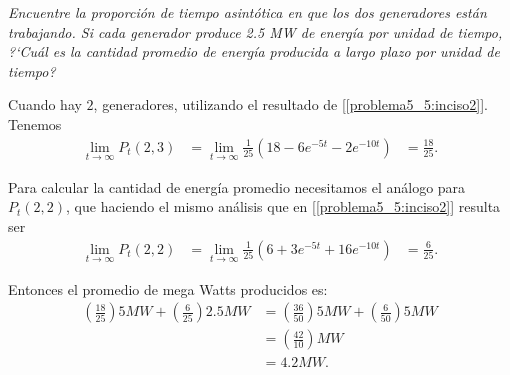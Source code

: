 \emph{
    Encuentre la proporci\'on de tiempo asint\'otica en que los dos generadores est\'an trabajando. 
    Si cada generador produce 2.5 MW de energ\'ia por unidad de tiempo, ?`Cu\'al es la cantidad promedio 
    de energ\'ia producida a largo plazo por unidad de tiempo?\pn
}

\afterstatement\pn

Cuando hay $2$, generadores, utilizando el resultado de [\ref{problema5_5:inciso2}].
Tenemos
\begin{align}
        \lim_{t \rightarrow \infty} P_t(2,3)    &= \lim_{t \rightarrow \infty}   \frac{1}{25}    (18 - 6 e^{-5t} - 2 e^{-10t}) 
                                                &= \frac{18}{25}.
\end{align}\pn

Para calcular la cantidad de energía promedio necesitamos el análogo para $P_t(2, 2)$, que haciendo el mismo
análisis que en [\ref{problema5_5:inciso2}] resulta ser
\begin{align}
        \lim_{t \rightarrow \infty} P_t(2,2)    &=  \lim_{t \rightarrow \infty}   \frac{1}{25}    (6 + 3 e^{-5t} + 16 e^{-10t}) 
                                                &=  \frac{6}{25}.
\end{align}\pn

Entonces el promedio de mega Watts producidos es:
\begin{align}
    \left(\frac{18}{25}\right) 5 MW + \left(\frac{6}{25}\right) 2.5 MW  &=  \left(\frac{36}{50}\right) 5 MW + \left(\frac{6}{50}\right) 5 MW  \\
                                                                        &=  \left(\frac{42}{10}\right)   MW                      \\
                                                                        &=  4.2 MW.
\end{align}